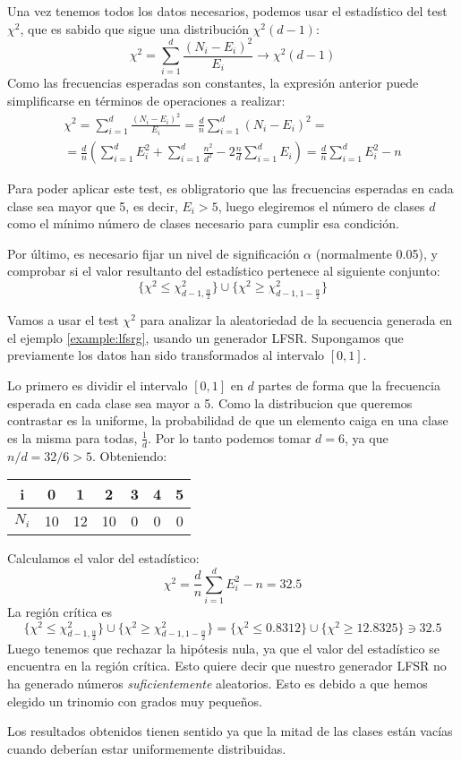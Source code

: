 Una vez tenemos todos los datos necesarios, podemos usar el estadístico del test $\chi^2$, que es sabido que sigue una distribución $\chi^2(d-1)$:
\[
\chi^2=\sum_{i=1}^d\frac{(N_i-E_i)^2}{E_i} \longrightarrow \chi^2(d-1)
\]
Como las frecuencias esperadas son constantes, la expresión anterior puede simplificarse en términos de operaciones a realizar:
\begin{multline}
\chi^2=\sum_{i=1}^d\frac{(N_i-E_i)^2}{E_i}=\frac{d}{n}\sum_{i=1}^d(N_i-E_i)^2= \\
=\frac{d}{n}\left(\sum_{i=1}^dE_i^2+\sum_{i=1}^d\frac{n^2}{d^2}-2\frac{n}{d}\sum_{i=1}^dE_i\right)=\frac{d}{n}\sum_{i=1}^dE_i^2-n
\end{multline}

Para poder aplicar este test, es obligratorio que las frecuencias esperadas en cada clase sea mayor que 5, es decir, $E_i>5$, luego elegiremos el número de clases $d$ como el mínimo número de clases necesario para cumplir esa condición.

Por último, es necesario fijar un nivel de significación $\alpha$ (normalmente  0.05), y comprobar si el valor resultanto del estadístico pertenece al siguiente conjunto:
\[
\{\chi^2\leq \chi^2_{d-1,\frac{\alpha}{2}}\}\cup\{\chi^2\geq \chi^2_{d-1,1-\frac{\alpha}{2}}\}
\]

\begin{example}
Vamos a usar el test $\chi^2$ para analizar la aleatoriedad de la secuencia generada en el ejemplo \ref{example:lfsrg}, usando un generador LFSR. Supongamos que previamente los datos han sido transformados al intervalo $[0,1]$.

Lo primero es dividir el intervalo $[0,1]$ en $d$ partes de forma que la frecuencia esperada en cada clase sea mayor a 5. Como la distribucion que queremos contrastar es la uniforme, la probabilidad de que un elemento caiga en una clase es la misma para todas, $\frac{1}{d}$. Por lo tanto podemos tomar $d=6$, ya que $n/d=32/6>5$. Obteniendo:

\begin{center}
\begin{tabular}{c|cccccc}
i & 0 & 1 & 2 & 3 & 4 & 5 \\ 
\hline 
$N_i$ & 10 & 12 & 10 & 0 & 0 & 0 \\ 
\end{tabular} 
\end{center}
Calculamos el valor del estadístico:
\[
\chi^2=\frac{d}{n}\sum_{i=1}^dE_i^2-n=32.5
\]
La región crítica es 
\[
\{\chi^2\leq \chi^2_{d-1,\frac{\alpha}{2}}\}\cup\{\chi^2\geq \chi^2_{d-1,1-\frac{\alpha}{2}}\}=
\{\chi^2\leq 0.8312 \}\cup\{\chi^2\geq 12.8325 \}\ni 32.5
\]
Luego tenemos que rechazar la hipótesis nula, ya que el valor del estadístico se encuentra en la región crítica. Esto quiere decir que nuestro generador LFSR no ha generado números \textit{suficientemente} aleatorios. Esto es debido a que hemos elegido un trinomio con grados muy pequeños.

Los resultados obtenidos tienen sentido ya que la mitad de las clases están vacías cuando deberían estar uniformemente distribuidas.

\end{example}

